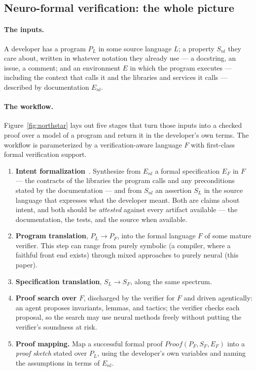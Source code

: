 \subsection{Neuro-formal verification: the whole picture}
\label{sec:northstar}

\paragraph{The inputs.} A developer has a program $P_L$ in some source language
$L$; a property $S_{nl}$ they care about, written in whatever notation they
already use --- a docstring, an issue, a comment; and an environment $E$ in
which the program executes --- including the context that calls it and the
libraries and services it calls --- described by documentation $E_{nl}$.

\paragraph{The workflow.} Figure~\ref{fig:northstar} lays out five stages that
turn those inputs into a checked proof over a model of a program and return it
in the developer's own terms.
The workflow is parameterized by a verification-aware language $F$ with
first-class formal verification support.

\begin{enumerate}
\item \textbf{Intent formalization}~\cite{lahiri2026intent}.
  Synthesize from $E_{nl}$ a formal specification $E_F$ in $F$ --- the
  contracts of the libraries the program calls and any preconditions stated
  by the documentation --- and from $S_{nl}$ an assertion $S_L$ in the source
  language that expresses what the developer meant. Both are claims about intent, and
  both should be \emph{attested} against every artifact available --- the
  documentation, the tests, and the source when available.
\item \textbf{Program translation}, $P_L \rightarrow P_F$, into the formal
  language $F$ of some mature verifier. This step can 
  range from purely symbolic (a compiler, where a faithful front end exists)
  through mixed approaches to purely neural (this paper).
\item \textbf{Specification translation}, $S_L \rightarrow S_F$, along the same
  spectrum.
\item \textbf{Proof search over $F$}, discharged by the verifier for $F$ and
  driven agentically: an agent proposes invariants, lemmas, and tactics; the
  verifier checks each proposal, so the search may use neural methods freely
  without putting the verifier's soundness at risk.
\item \textbf{Proof mapping.} Map a successful formal proof
  $\mathit{Proof}(P_F, S_F, E_F)$ into a \emph{proof sketch} stated over $P_L$,
  using the developer's own variables and naming the assumptions in terms of
  $E_{nl}$.
\end{enumerate}

